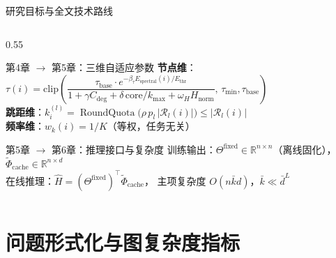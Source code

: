 \documentclass[aspectratio=169,9pt,xcolor=dvipsnames]{beamer}
\newcommand{\highlight}[1]{\textcolor{myred}{\textbf{#1}}}
\newcommand{\kbar}{\ensuremath{\bar{k}}}
\begin{document}
\begin{frame}{研究目标与全文技术路线}
\begin{columns}[T]
\begin{column}{0.55\textwidth}
      \smallskip
      \begin{block}{第4章 $\to$ 第5章：三维自适应参数}
        \small
        \textbf{节点维}：$\tau(i)=\mathrm{clip}\!\left(\dfrac{\tau_{\mathrm{base}}\cdot e^{-\beta_\tau E_{\mathrm{spectral}}(i)/E_{\mathrm{thr}}}}{1+\gamma C_{\mathrm{deg}}+\delta\,\mathrm{core}/k_{\max}+\omega_H H_{\mathrm{norm}}},\,\tau_{\min},\tau_{\mathrm{base}}\right)$\\[4pt]
        \textbf{跳距维}：$k_i^{(l)}=\operatorname{RoundQuota}\!\bigl(\rho\,p_l\,|\mathcal{R}_l(i)|\bigr)\leq|\mathcal{R}_l(i)|$\\[2pt]
        \textbf{频率维}：$w_k(i)=1/K$（等权，任务无关）
      \end{block}

      \smallskip
      \begin{block}{第5章 $\to$ 第6章：推理接口与复杂度}
        \small
        训练输出：$\Theta^{\mathrm{fixed}}\in\mathbb{R}^{n\times n}$（离线固化），$\tilde{\Phi}_{\mathrm{cache}}\in\mathbb{R}^{n\times d}$\\[2pt]
        在线推理：$\hat{H}=(\Theta^{\mathrm{fixed}})^\top\tilde{\Phi}_{\mathrm{cache}}$，
        主项复杂度 \highlight{$O(n\kbar d)$}，$\kbar\ll\bar{d}^L$
      \end{block}
    \end{column}
  \end{columns}
\end{frame}

\section{问题形式化与图复杂度指标}
\end{document}
